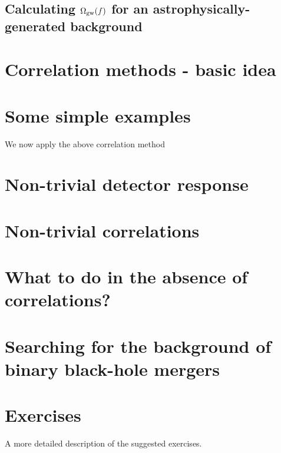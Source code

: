 \documentclass[11pt]{article}
\numberwithin{equation}{section}
\begin{document}
\subsection{Calculating $\Omega_{\rm gw}(f)$ for an
astrophysically-generated background}
\label{s:Phinney_formula}

\section{Correlation methods - basic idea}
\label{s:correlations}

\section{Some simple examples}
\label{s:simple_examples}

We now apply the above correlation method

\section{Non-trivial detector response}

\section{Non-trivial correlations}

\section{What to do in the absence of correlations?}

\section{Searching for the background of binary black-hole
mergers}
\label{s:nonstationary}

\newpage
\section{Exercises}
\label{s:exercises}

A more detailed description of the suggested exercises.
\end{document}
